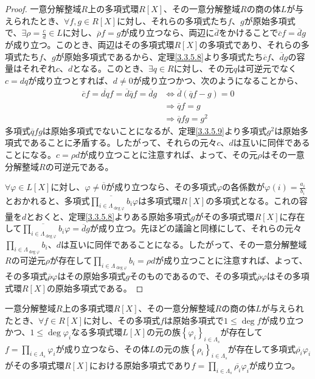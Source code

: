 \documentclass[dvipdfmx]{jsarticle}
\begin{document}
\begin{proof}
一意分解整域$R$上の多項式環$R[ X]$、その一意分解整域$R$の商の体$L$が与えられたとき、$\forall f,g \in R[ X]$に対し、それらの多項式たち$f$、$g$が原始多項式で、$\exists\rho = \frac{c}{d} \in L$に対し、$\overline{\rho}f = g$が成り立つなら、両辺に$\overline{d}$をかけることで$\overline{c}f = \overline{d}g$が成り立つ。このとき、両辺はその多項式環$R[ X]$の多項式であり、それらの多項式たち$f$、$g$が原始多項式であるから、定理\ref{3.3.5.8}より多項式たち$\overline{c}f$、$\overline{d}g$の容量はそれぞれ$c$、$d$となる。このとき、$\exists q \in R$に対し、その元$q$は可逆元でなく$c = dq$が成り立つとすれば、$d \neq 0$が成り立つかつ、次のようになることから、
\begin{align*}
\overline{c}f = \overline{dq}f = \overline{d}\overline{q}f = \overline{d}g &\Leftrightarrow \overline{d}\left( \overline{q}f - g \right) = 0\\
&\Rightarrow \overline{q}f = g\\
&\Rightarrow \overline{q}fg = g^{2}
\end{align*}
多項式$\overline{q}fg$は原始多項式でないことになるが、定理\ref{3.3.5.9}より多項式$g^{2}$は原始多項式であることに矛盾する。したがって、それらの元々$c$、$d$は互いに同伴であることになる。$c = \rho d$が成り立つことに注意すれば、よって、その元$\rho$はその一意分解整域$R$の可逆元である。\par
$\forall\varphi \in L[ X]$に対し、$\varphi \neq \overline{0}$が成り立つなら、その多項式$\varphi$の各係数が$\varphi(i) = \frac{a_{i}}{b_{i}}$とおかれると、多項式$\overline{\prod_{i \in \varLambda_{\deg\varphi}} b_{i}}\varphi$は多項式環$R[ X]$の多項式となる。これの容量を$d$とおくと、定理\ref{3.3.5.8}よりある原始多項式$g$がその多項式環$R[ X]$に存在して$\overline{\prod_{i \in \varLambda_{\deg\varphi}} b_{i}}\varphi = \overline{d}g$が成り立つ。先ほどの議論と同様にして、それらの元々$\prod_{i \in \varLambda_{\deg\varphi}} b_{i}$、$d$は互いに同伴であることになる。したがって、その一意分解整域$R$の可逆元$\rho$が存在して$\prod_{i \in \varLambda_{\deg\varphi}} b_{i} = \rho d$が成り立つことに注意すれば、よって、その多項式$\overline{\rho}\varphi$はその原始多項式$g$そのものであるので、その多項式$\overline{\rho}\varphi$はその多項式環$R[ X]$の原始多項式である。
\end{proof}
\begin{thm}\label{3.3.5.11}
一意分解整域$R$上の多項式環$R[ X]$、その一意分解整域$R$の商の体$L$が与えられたとき、$\forall f \in R[ X]$に対し、その多項式$f$は原始多項式で$1 \leq \deg f$が成り立つかつ、$1 \leq \deg\varphi_{i}$なる多項式環$L[ X]$の元の族$\left\{ \varphi_{i} \right\}_{i \in \varLambda_{s}}$が存在して$f = \prod_{i \in \varLambda_{s}} \varphi_{i}$が成り立つなら、その体$L$の元の族$\left\{ \rho_{i} \right\}_{i \in \varLambda_{s}}$が存在して多項式$\overline{\rho_{i}}\varphi_{i}$がその多項式環$R[ X]$における原始多項式であり$f = \prod_{i \in \varLambda_{s}} {\overline{\rho_{i}}\varphi_{i}}$が成り立つ。
\end{thm}
\end{document}
